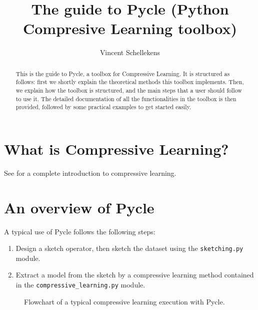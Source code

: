 \documentclass[]{article}
\title{The guide to Pycle (\textbf{Py}thon \textbf{C}ompresive \textbf{Le}arning toolbox)}
\author{Vincent Schellekens}
\newcommand{\code}{\texttt}
\renewcommand{\Vec}[1]{\bm{#1}} %
\begin{document}

\maketitle

\begin{abstract}
	This is the guide to Pycle, a toolbox for Compressive Learning. It is structured as follows: first we shortly explain the theoretical methods this toolbox implements. Then, we explain how the toolbox is structured, and the main steps that a user should follow to use it. The detailed documentation of all the functionalities in the toolbox is then provided, followed by some practical examples to get started easily.
\end{abstract}


\section{What is Compressive Learning?}
See \cite{gribonval2017compressive} for a complete introduction to compressive learning.

\section{An overview of Pycle}

A typical use of Pycle follows the following steps:
\begin{enumerate}
	\item Design a sketch operator, then sketch the dataset using the \code{sketching.py} module.
	\item Extract a model from the sketch by a compressive learning method contained in the \code{compressive\_learning.py} module.
\end{enumerate}





	
		
\begin{figure}[!htb]
	\centering
	\caption{Flowchart of a typical compressive learning execution with Pycle.}
	\label{fig:flowchart}
\end {figure}
		
\end{document}
